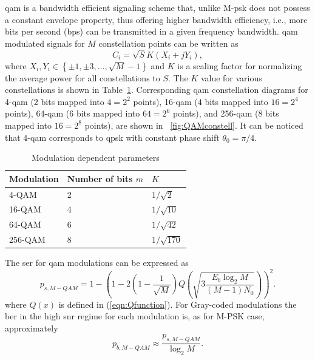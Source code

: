 %
\gls{qam} is a bandwidth efficient signaling scheme that, unlike M-\gls{psk} does not possess a
constant envelope property, thus offering higher bandwidth efficiency, i.e., more bits per second (bps) can be transmitted in a given frequency bandwidth. \gls{qam} modulated signals for $M$ constellation points can be written as
%
\begin{equation*}
C_i=\sqrt{S}K(X_i + jY_i),
\end{equation*}
%
where $X_i, Y_i \in \left\lbrace\pm 1, \pm 3,\ldots,\sqrt{M}-1 \right\rbrace$ and $K$ is a scaling factor for normalizing the average power for all constellations to $S$. The $K$ value for various constellations is shown in Table~\ref{tab:param}. Corresponding \gls{qam} constellation diagrams for 4-\gls{qam} ($2$ bits mapped into $4=2^2$ points), 16-\gls{qam} ($4$ bits mapped into $16=2^4$ points), 64-\gls{qam} ($6$ bits mapped into $64=2^6$ points), and 256-\gls{qam} ($8$ bits mapped into $16=2^8$ points), are shown in ~\cref{fig:QAMconstell}. It can be noticed that 4-\gls{qam} corresponds to \gls{qpsk} with constant phase shift $\theta_0 =\pi/4$.
%
\begin{table}[htb]
\centering
\scriptsize
\renewcommand\arraystretch{1.6}
\caption{Modulation dependent parameters}\label{tab:param}
\begin{tabular}{ p{3cm} p{3cm} p{3cm}}\toprule
Modulation&Number of bits $m$&$K$\\\midrule
4-QAM&2&$1/\sqrt{2}$\\
16-QAM&4&$1/\sqrt{10}$\\
64-QAM&6&$1/\sqrt{42}$\\
256-QAM&8&$1/\sqrt{170}$\\\bottomrule
\end{tabular}
\end{table}
%
The \gls{ser} for \gls{qam} modulations can be expressed as
%
\begin{equation*}
p_{s,M-QAM} = 1-\left( 1-2\left( 1-\frac{1}{\sqrt{M}}\right)Q\left( \sqrt{3\frac{E_b\log_2 M}{(M-1)N_0}}\right) \right) ^2.
\end{equation*}
%
where $Q(x)$ is defined in (\ref{eqn:Qfunction}). For Gray-coded modulations  the \gls{ber} in the high \gls{snr} regime for each modulation is, as for M-PSK case, approximately
\begin{equation}
\label{eqn:MQAMmodBER}
p_{b,M-QAM} \approx \frac{p_{s,M-QAM}}{\log_2M}.
\end{equation}


